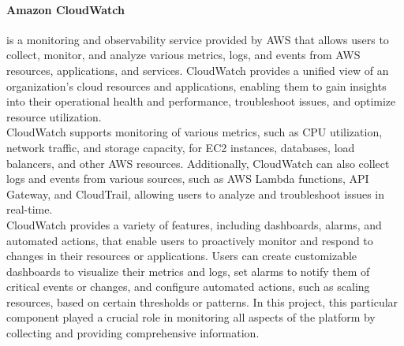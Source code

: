 \documentclass[a4paper,12pt]{report}
\begin{document}
\paragraph{Amazon CloudWatch} is a monitoring and observability service provided by AWS that allows users to collect, monitor, and analyze various metrics, logs, and events from AWS resources, applications, and services. CloudWatch provides a unified view of an organization's cloud resources and applications, enabling them to gain insights into their operational health and performance, troubleshoot issues, and optimize resource utilization.\\
CloudWatch supports monitoring of various metrics, such as CPU utilization, network traffic, and storage capacity, for EC2 instances, databases, load balancers, and other AWS resources. Additionally, CloudWatch can also collect logs and events from various sources, such as AWS Lambda functions, API Gateway, and CloudTrail, allowing users to analyze and troubleshoot issues in real-time.\\
CloudWatch provides a variety of features, including dashboards, alarms, and automated actions, that enable users to proactively monitor and respond to changes in their resources or applications. Users can create customizable dashboards to visualize their metrics and logs, set alarms to notify them of critical events or changes, and configure automated actions, such as scaling resources, based on certain thresholds or patterns.
In this project, this particular component played a crucial role in monitoring all aspects of the platform by collecting and providing comprehensive information.\\\\
%
%
\end{document}
